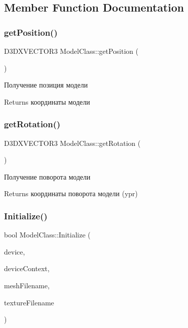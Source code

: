 \subsection{Member Function Documentation}
\mbox{\label{class_model_class_a21e42c01df8e01b99bcdd5225f52e4ef}} 
\subsubsection{\texorpdfstring{get\+Position()}{getPosition()}}
{\footnotesize\ttfamily D3\+D\+X\+V\+E\+C\+T\+O\+R3 Model\+Class\+::get\+Position (\begin{DoxyParamCaption}{ }\end{DoxyParamCaption})}



Получение позиция модели 

\begin{DoxyReturn}{Returns}
координаты модели 
\end{DoxyReturn}
\mbox{\label{class_model_class_a4c89a288f58e5193179d455c0e24318b}} 
\subsubsection{\texorpdfstring{get\+Rotation()}{getRotation()}}
{\footnotesize\ttfamily D3\+D\+X\+V\+E\+C\+T\+O\+R3 Model\+Class\+::get\+Rotation (\begin{DoxyParamCaption}{ }\end{DoxyParamCaption})}



Получение поворота модели 

\begin{DoxyReturn}{Returns}
координаты поворота модели (ypr) 
\end{DoxyReturn}
\mbox{\label{class_model_class_a0a79383e0c8b045480f776ad05cb059a}} 
\subsubsection{\texorpdfstring{Initialize()}{Initialize()}}
{\footnotesize\ttfamily bool Model\+Class\+::\+Initialize (\begin{DoxyParamCaption}\item[{I\+D3\+D11\+Device $\ast$}]{device,  }\item[{I\+D3\+D11\+Device\+Context $\ast$}]{device\+Context,  }\item[{\hyperlink{class_path_class}{Path\+Class} $\ast$}]{mesh\+Filename,  }\item[{\hyperlink{class_path_class}{Path\+Class} $\ast$}]{texture\+Filename }\end{DoxyParamCaption})}

